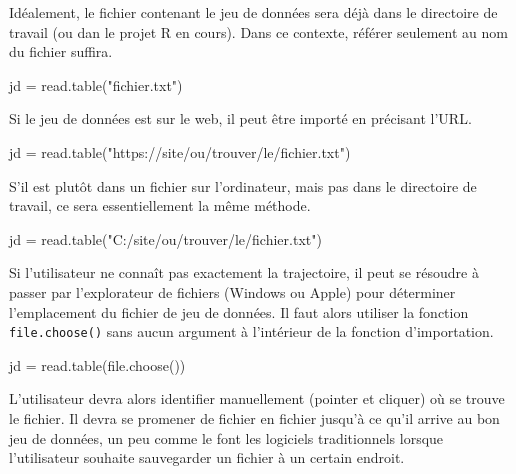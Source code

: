 \documentclass[
]{book}
\newenvironment{Shaded}{}{}
\newcommand{\FunctionTok}[1]{#1}
\newcommand{\NormalTok}[1]{#1}
\newcommand{\OtherTok}[1]{#1}
\newcommand{\StringTok}[1]{#1}
\begin{document}
Idéalement, le fichier contenant le jeu de données sera déjà dans le directoire de travail (ou dan le projet R en cours). Dans ce contexte, référer seulement au nom du fichier suffira.

\begin{Shaded}
\begin{Highlighting}[]
\NormalTok{jd }\OtherTok{=} \FunctionTok{read.table}\NormalTok{(}\StringTok{"fichier.txt"}\NormalTok{)}
\end{Highlighting}
\end{Shaded}

Si le jeu de données est sur le web, il peut être importé en précisant l'URL.

\begin{Shaded}
\begin{Highlighting}[]
\NormalTok{jd }\OtherTok{=} \FunctionTok{read.table}\NormalTok{(}\StringTok{"https://site/ou/trouver/le/fichier.txt"}\NormalTok{)}
\end{Highlighting}
\end{Shaded}

S'il est plutôt dans un fichier sur l'ordinateur, mais pas dans le directoire de travail, ce sera essentiellement la même méthode.

\begin{Shaded}
\begin{Highlighting}[]
\NormalTok{jd }\OtherTok{=} \FunctionTok{read.table}\NormalTok{(}\StringTok{"C:/site/ou/trouver/le/fichier.txt"}\NormalTok{)}
\end{Highlighting}
\end{Shaded}

Si l'utilisateur ne connaît pas exactement la trajectoire, il peut se résoudre à passer par l'explorateur de fichiers (Windows ou Apple) pour déterminer l'emplacement du fichier de jeu de données. Il faut alors utiliser la fonction \texttt{file.choose()} sans aucun argument à l'intérieur de la fonction d'importation.

\begin{Shaded}
\begin{Highlighting}[]
\NormalTok{jd }\OtherTok{=} \FunctionTok{read.table}\NormalTok{(}\FunctionTok{file.choose}\NormalTok{())}
\end{Highlighting}
\end{Shaded}

L'utilisateur devra alors identifier manuellement (pointer et cliquer) où se trouve le fichier. Il devra se promener de fichier en fichier jusqu'à ce qu'il arrive au bon jeu de données, un peu comme le font les logiciels traditionnels lorsque l'utilisateur souhaite sauvegarder un fichier à un certain endroit.
\end{document}
